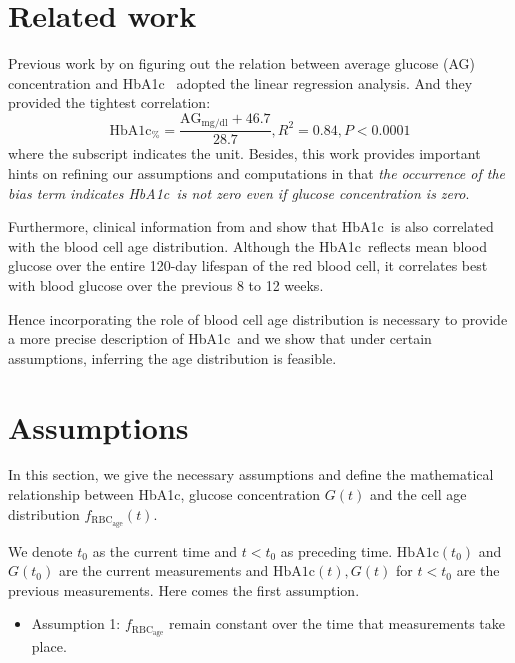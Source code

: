 \documentclass{article}
\newcommand{\hba}{\textrm{HbA1c}}
\newcommand{\f}{f_{\mathrm{RBC}_{\mathrm{age}}}}
\begin{document}
\section{Related work}
Previous work by \citet{nathan2008translating} on figuring out the relation between average glucose (AG) concentration 
and \hba\ 
adopted the linear regression analysis. And they provided the tightest correlation: %
\begin{equation}
\mathrm{HbA1c}_\% = \frac{\mathrm{AG}_{\mathrm{mg/dl}} + 46.7}{28.7}, R^2=0.84, P<0.0001
\label{ag-h}
\end{equation}
where the subscript indicates the unit. Besides, this work provides important hints on refining our assumptions and computations in that \emph{the occurrence of the bias term indicates \hba\ is not zero even if glucose concentration is zero}.

Furthermore, clinical information from \citet{nathan1984clinical} and \citet{goldstein1984glycosylated} show that \hba\ is also correlated with the blood cell age distribution. Although the \hba\ reflects mean blood glucose over the entire 120-day lifespan of the red blood cell, it correlates best with blood glucose over the previous 8 to 12 weeks.

Hence incorporating the role of blood cell age distribution is necessary to provide a more precise description of \hba\, and we show that under certain assumptions, inferring the age distribution is feasible.

\section{Assumptions}
In this section, we give the necessary assumptions and define the mathematical relationship between \hba, glucose concentration $G(t)$ and the cell age distribution $\f(t)$.

We denote $t_0$ as the current time and $t<t_0$ as preceding time. $\hba(t_0)$ and $G(t_0)$ are the current measurements and $\hba(t), G(t)$ for $t<t_0$ are the previous measurements. Here comes the first assumption.

\begin{itemize}
\item Assumption 1: $\f$ remain constant over the time that measurements take place.
\end{itemize}
\end{document}
